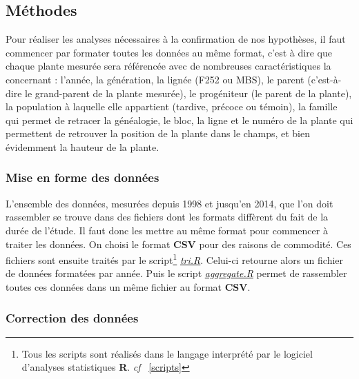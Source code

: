 \documentclass[12pt,a4paper]{article}
\begin{document}
			 		\subsection{Méthodes}
			 			
			 			Pour réaliser les analyses nécessaires à la confirmation de nos hypothèses, il faut commencer par formater toutes les données au même format, c'est à dire que chaque plante mesurée sera référencée avec de nombreuses caractéristiques la concernant : l'année, la génération, la lignée (F252 ou MBS), le parent (c'est-à-dire le \og grand-parent \fg de la plante mesurée), le progéniteur (le parent de la plante), la population à laquelle elle appartient (tardive, précoce ou témoin), la famille qui permet de retracer la généalogie, le bloc, la ligne et le numéro de la plante qui permettent de retrouver la position de la plante dans le champs, et bien évidemment la hauteur de la plante.
			 			
			 			\subsubsection{Mise en forme des données}
			 				
			 				L'ensemble des données, mesurées depuis 1998 et jusqu'en 2014, que l'on doit rassembler se trouve dans des fichiers dont les formats diffèrent du fait de la durée de l'étude. Il faut donc les mettre au même format pour commencer à traiter les données. On choisi le format \textbf{CSV} pour des raisons de commodité. Ces fichiers sont ensuite traités par le script\footnote{Tous les scripts sont réalisés dans le langage interprété par le logiciel d'analyses statistiques \textbf{R}. \textit{cf} ~\ref{scripts}} \textit{\ul{tri.R}}. Celui-ci retourne alors un fichier de données formatées par année. Puis le script \textit{\ul{aggregate.R}} permet de rassembler toutes ces données dans un même fichier au format \textbf{CSV}.
			 			
			 			\subsubsection{Correction des données}
			 				
\end{document}
